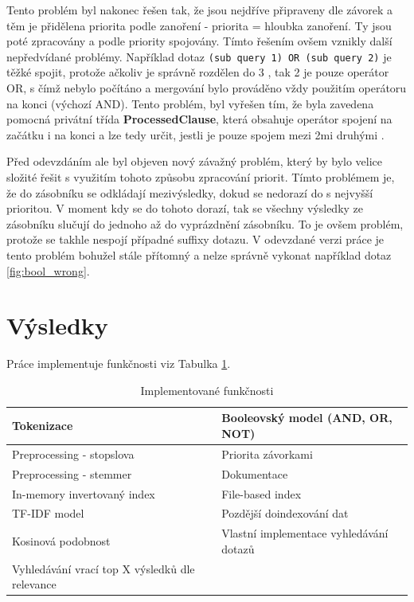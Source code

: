 \documentclass[12pt, letterpaper]{article}
\begin{document}
Tento problém byl nakonec řešen tak, že jsou nejdříve připraveny  dle závorek a těm je přidělena
priorita podle zanoření - priorita = hloubka zanoření. Ty jsou poté zpracovány a podle priority spojovány.
Tímto řešením ovšem vznikly další nepředvídané problémy. Například dotaz \texttt{(sub query 1) OR (sub query 2)} je
těžké spojit, protože ačkoliv je správně rozdělen do 3 , tak 2  je pouze operátor OR,
s čímž nebylo počítáno a mergování bylo prováděno vždy použitím operátoru na konci  (výchozí AND).
Tento problém, byl vyřešen tím, že byla zavedena pomocná privátní třída \textbf{ProcessedClause}, která obsahuje
operátor spojení na začátku i na konci  a lze tedy určit, jestli je  pouze spojem mezi
2mi druhými .

Před odevzdáním ale byl objeven nový závažný problém, který by bylo velice složité řešit s využitím tohoto způsobu
zpracování priorit. Tímto problémem je, že do zásobníku se odkládají mezivýsledky, dokud se nedorazí do 
s nejvyšší prioritou. V moment kdy se do tohoto  dorazí, tak se všechny výsledky ze zásobníku slučují do
jednoho až do vyprázdnění zásobníku. To je ovšem problém, protože se takhle nespojí případné suffixy dotazu. V odevzdané
verzi práce je tento problém bohužel stále přítomný a nelze správně vykonat například dotaz \ref{fig:bool_wrong}.
%
%
\section{Výsledky}
Práce implementuje funkčnosti viz Tabulka \ref{table:implemented}.

\begin{table}[H]
    \begin{center}
        \begin{tabular}{ | m{} | m{} | }
            \hline
            Tokenizace                                      & Booleovský model (AND, OR, NOT) \\
            \hline
            Preprocessing - stopslova                       & Priorita závorkami \\
            \hline
            Preprocessing - stemmer                         & Dokumentace\\
            \hline
            In-memory invertovaný index                     & File-based index \\
            \hline
            TF-IDF model                                    & Pozdější doindexování dat \\
            \hline
            Kosinová podobnost                              & Vlastní implementace vyhledávání dotazů \\
            \hline
            Vyhledávání vrací top X výsledků dle relevance  & \\
            \hline
        \end{tabular}
        \caption{Implementované funkčnosti}
        \label{table:implemented}
    \end{center}
\end{table}
\end{document}
